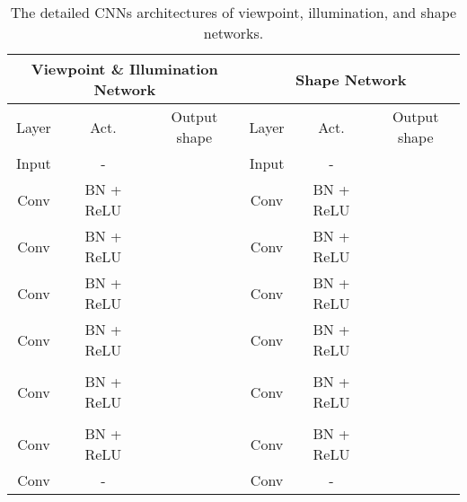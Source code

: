 \begin{appendix}
\begin{table}[ht]
	\centering
	\footnotesize
	\setlength{\abovecaptionskip}{3pt}
    \setlength{\belowcaptionskip}{-5pt}
	\newcommand{\tabincell}[2]{\begin{tabular}{@{}#1@{}}#2\end{tabular}}
	\begin{tabular}{c|c|c|c|c|c}
		\hline 
		\multicolumn{3}{c|}{Viewpoint \& Illumination Network} & \multicolumn{3}{c}{Shape Network} \\ \hline
		Layer & Act. & Output shape & Layer & Act. & Output shape \\ \hline
		Input & - &  & Input & - &  \\
		Conv  & BN + ReLU &  & Conv  & BN + ReLU &  \\
		Conv  & BN + ReLU &  & Conv  & BN + ReLU &  \\
    	Conv  & BN + ReLU &  & Conv  & BN + ReLU &  \\ 
    	Conv  & BN + ReLU &  & Conv  & BN + ReLU &  \\
        \multirow{3}{*}{} & \multirow{3}{*}{} & \multirow{3}{*}{} & \multirow{3}{*}{} & \multirow{3}{*}{} & \multirow{3}{*}{} \\
		  &  &  &  &  & \\
		  &  &  &  &  & \\
		Conv  & BN + ReLU &  & Conv  & BN + ReLU &  \\ 
		\multirow{3}{*}{} & \multirow{3}{*}{} & \multirow{3}{*}{} & \multirow{3}{*}{} & \multirow{3}{*}{} & \multirow{3}{*}{}\\
		  &  &  &  &  & \\ 
		  &  &  &  &  & \\ 
		Conv  & BN + ReLU &  & Conv  & BN + ReLU &  \\
	    Conv  & - &  & Conv  & - &  \\
		\hline
	\end{tabular}
	\renewcommand{\captionlabelfont}{\footnotesize}
	\caption{\footnotesize The detailed CNNs architectures of viewpoint, illumination, and shape networks.}\label{view_illum_shape}
\end{table}



\end{appendix}
